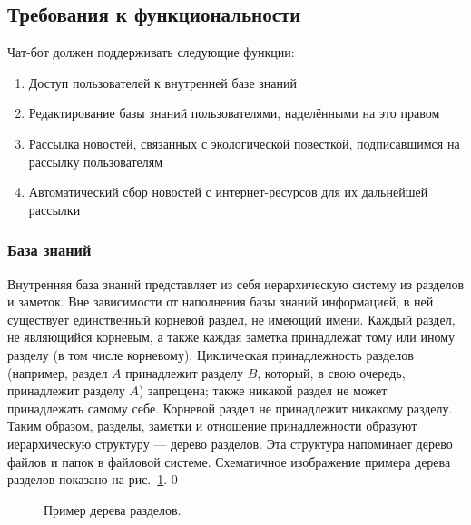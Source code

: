 \subsection{Требования к функциональности}
\label{sec:req:fn}
Чат-бот должен поддерживать следующие функции:
\begin{enumerate}
    \item
        Доступ пользователей к внутренней базе знаний
    \item
        Редактирование базы знаний пользователями, наделёнными на это правом
    \item
        Рассылка новостей, связанных с экологической повесткой, подписавшимся на рассылку
        пользователям
    \item
        Автоматический сбор новостей с интернет-ресурсов для их дальнейшей рассылки
\end{enumerate}

\subsubsection{База знаний}
    \label{sec:req:fn:kb}
    Внутренняя база знаний представляет из себя иерархическую систему из разделов
    и заметок. Вне зависимости от наполнения базы знаний информацией, в ней существует единственный
    корневой раздел, не имеющий имени. Каждый раздел, не являющийся корневым, а также
    каждая заметка принадлежат тому или иному разделу (в том числе корневому). Циклическая
    принадлежность разделов (например, раздел \(A\) принадлежит разделу \(B\), который, в свою
    очередь, принадлежит разделу \(A\)) запрещена; также никакой раздел не может принадлежать самому
    себе. Корневой раздел не принадлежит никакому разделу. Таким образом, разделы, заметки и отношение
    принадлежности образуют иерархическую структуру --- дерево разделов. Эта структура напоминает
    дерево файлов и папок в файловой системе. Схематичное изображение примера дерева разделов
    показано на рис.~\ref{fig:req:fn:kb:tree}.
    \newlength{\treeindent}
    \newlength{\treeskip}
    \setlength{\treeindent}{2em}
    \setlength{\treeskip}{-3ex}
    \setcounter{treeline}0
    \newcommand{\mypoint}[2]{(#2 * \treeindent, #1 * \treeskip)}
    \newcommand{\mynode}[2]{
        \node at \mypoint{\thetreeline}{#1} [anchor = west] {#2};%
        \stepcounter{treeline}
    }
    \begin{figure}[h]
        \centering
        \caption{Пример дерева разделов.}
        \label{fig:req:fn:kb:tree}
    \end{figure}

